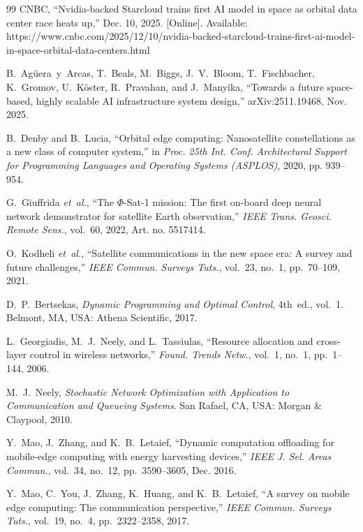 \documentclass[conference]{IEEEtran}
\theoremstyle{remark}
\begin{document}

\begin{thebibliography}{99}
CNBC, ``Nvidia-backed Starcloud trains first AI model in space as orbital data center race heats up,'' Dec. 10, 2025. [Online]. Available: https://www.cnbc.com/2025/12/10/nvidia-backed-starcloud-trains-first-ai-model-in-space-orbital-data-centers.html

B.~Ag\"uera~y~Arcas, T.~Beals, M.~Biggs, J.~V.~Bloom, T.~Fischbacher, K.~Gromov, U.~K\"oster, R.~Pravahan, and J.~Manyika, ``Towards a future space-based, highly scalable AI infrastructure system design,'' arXiv:2511.19468, Nov. 2025.

B.~Denby and B.~Lucia, ``Orbital edge computing: Nanosatellite constellations as a new class of computer system,'' in \emph{Proc. 25th Int. Conf. Architectural Support for Programming Languages and Operating Systems (ASPLOS)}, 2020, pp. 939--954.

G.~Giuffrida \emph{et~al.}, ``The $\Phi$-Sat-1 mission: The first on-board deep neural network demonstrator for satellite Earth observation,'' \emph{IEEE Trans. Geosci. Remote Sens.}, vol.~60, 2022, Art. no. 5517414.

O.~Kodheli \emph{et~al.}, ``Satellite communications in the new space era: A survey and future challenges,'' \emph{IEEE Commun. Surveys Tuts.}, vol.~23, no.~1, pp.~70--109, 2021.

D.~P.~Bertsekas, \emph{Dynamic Programming and Optimal Control}, 4th~ed., vol.~1. Belmont, MA, USA: Athena Scientific, 2017.

L.~Georgiadis, M.~J.~Neely, and L.~Tassiulas, ``Resource allocation and cross-layer control in wireless networks,'' \emph{Found. Trends Netw.}, vol.~1, no.~1, pp.~1--144, 2006.

M.~J.~Neely, \emph{Stochastic Network Optimization with Application to Communication and Queueing Systems}. San Rafael, CA, USA: Morgan \& Claypool, 2010.

Y.~Mao, J.~Zhang, and K.~B.~Letaief, ``Dynamic computation offloading for mobile-edge computing with energy harvesting devices,'' \emph{IEEE J. Sel. Areas Commun.}, vol.~34, no.~12, pp.~3590--3605, Dec. 2016.

Y.~Mao, C.~You, J.~Zhang, K.~Huang, and K.~B.~Letaief, ``A survey on mobile edge computing: The communication perspective,'' \emph{IEEE Commun. Surveys Tuts.}, vol.~19, no.~4, pp.~2322--2358, 2017.


\end{thebibliography}
\end{document}
